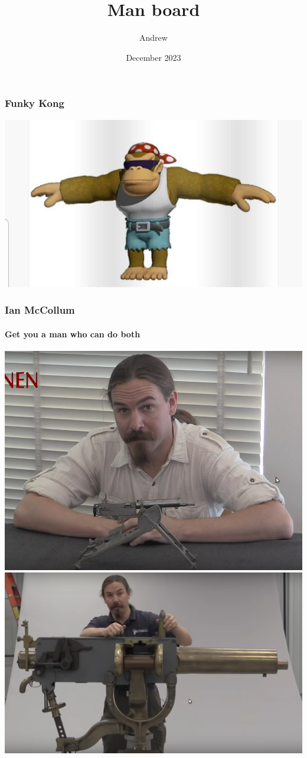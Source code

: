 \documentclass{beamer}
\title{Man board}
\author{Andrew}
\date{December 2023}
\begin{document}
\frame{\titlepage}

\begin{frame}
\frametitle{Funky Kong}
\includegraphics[height=\paperheight]{funky kong.jpg}
\end{frame}

\begin{frame}
	\frametitle{Ian McCollum}
		\framesubtitle{Get you a man who can do both}
	\vspace{1em}
	\includegraphics[scale=0.14]{ian 1.png}
	\includegraphics[scale=0.14]{ian 2.png}
\end{frame}
\end{document}
